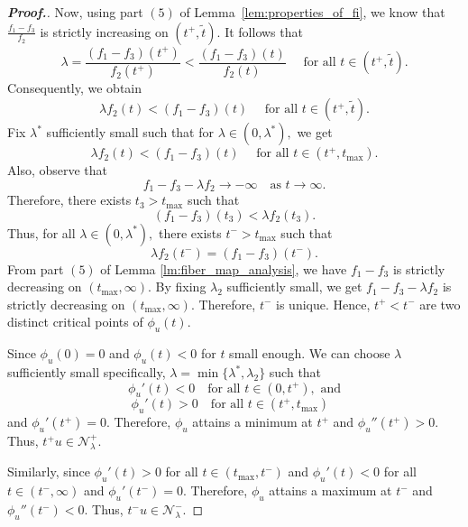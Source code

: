 \documentclass[11pt]{article}
\newcommand{\la} {\lambda}
\begin{document}
\begin{proof}[\bf Proof.]
Now, using part $(5)$
of Lemma~\ref{lem:properties_of_fi}, 
we know that $\frac{f_1 - f_3}{f_2}$
is strictly increasing on $(t^+, \tilde{t}).$
It follows that
\begin{equation*}
\lambda = 
\frac{(f_1 - f_3)(t^+)}{f_2(t^+)} < 
\frac{(f_1 - f_3)(t)}{f_2(t)} \quad 
\text{ for all } t \in (t^+, \tilde{t}). 
\end{equation*}
 Consequently, we obtain
\begin{equation*}
\lambda f_2(t) < (f_1 - f_3)(t) \quad 
\text{ for all } t \in (t^+, \tilde{t}). 
\end{equation*}
 Fix $\lambda^*$
sufficiently small such that for $\la\in(0,\la^*),$
we get
\begin{equation*}
\lambda f_2(t) < (f_1 - f_3)(t) \quad 
\text{ for all } t \in (t^+, t_{\max}). 
\end{equation*}
 Also, observe that
\begin{equation*}
f_1 - f_3 - \lambda f_2 \to -\infty \quad
 \text{as } t \to \infty. 
\end{equation*}
 Therefore, there exists $t_3 > t_{\max}$
such that
\begin{equation*}
(f_1 - f_3)(t_3) < \lambda f_2(t_3).
\end{equation*}
 Thus, for all $\lambda \in (0, \lambda^*),$
there exists $t^- > t_{\max}$
such that
\begin{equation*}
\lambda f_2(t^-) = (f_1 - f_3)(t^-).
\end{equation*}
From part $(5)$
of Lemma \ref{lm:fiber_map_analysis}, we have $f_1-f_3$
is strictly decreasing on $(t_{\max}, \infty).$
By fixing $\lambda_2$
sufficiently small, we get $f_1 - f_3 - \lambda f_2$
is strictly decreasing on $(t_{\max}, \infty).$
Therefore, $t^-$
is unique.
Hence, $t^+ < t^-$
are two distinct critical points of $\phi_u(t)$.

Since $\phi_u(0)=0$
and $\phi_u(t)<0$
for $t$
small enough.
We can choose $\la$
sufficiently small specifically, 
$\la=\min\{\la^*,\la_2\}$
such that
$$
\phi_u'(t) < 0 \quad \text{for all } 
t \in (0, t^+),   \text{ and} 
$$
$$
 \phi_u'(t) > 0 \quad \text{for all }
 t \in (t^+, t_{\max})  \ \ \
 $$
  and  
 $ 
\phi_u'(t^+) = 0.
$
Therefore, $\phi_u$
attains a minimum at $t^+$
and $\phi_u''(t^+) > 0.$
Thus,
$
t^+ u \in \mathcal{N}_\lambda^+.
$

Similarly, since $\phi_u'(t) > 0$
for all $t \in (t_{\max}, t^-)$
and $\phi_u'(t) < 0$
for all $t \in (t^-, \infty)$
and $\phi_u'(t^-) = 0.$
Therefore, $\phi_u$
attains a maximum at $t^-$
and $\phi_u''(t^-) < 0.$
Thus,
$
t^- u \in \mathcal{N}_\lambda^-.
$


\end{proof}
\end{document}
